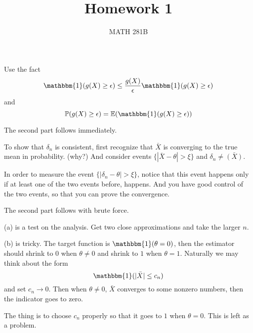 \documentclass[12pt]{article}
\newcommand{\1}{\mathbbm{1}}
\newenvironment{exercise}[2][Exercise]{\begin{trivlist}
\item[\hskip \labelsep {\bfseries #1}\hskip \labelsep {\bfseries #2.}]}{\end{trivlist}}
\newcommand{\E}{\operatorname{\mathbb{E}}}
\renewcommand{\P}{\operatorname{\mathbb{P}}}
\begin{document}
\title{Homework 1}%
\author{MATH 281B} %
\maketitle
\begin{exercise}{8.1}
\end{exercise}

Use the fact
$$
\1 (g(X) \geq \epsilon) \leq \frac{g(X)}{\epsilon} \1 (g(X) \geq \epsilon)
$$
and 
$$
\P (g(X) \geq \epsilon ) = \E (\1 (g(X) \geq \epsilon))
$$

The second part follows immediately.

\begin{exercise}{8.2}
\end{exercise}

To show that $\delta_n$ is consistent, first recognize that $\bar{X}$ is converging to the true mean in probability. (why?) And consider events $\{|\bar{X} - \theta| > \xi \}$ and $\delta_n \neq \bar{(X)}$.

In order to measure the event $\{|\delta_n - \theta| > \xi\}$, notice that this event happens only if at least one of the two events before, happens. And you have good control of the two events, so that you can prove the convergence.

The second part follows with brute force.

\begin{exercise}{8.8}
\end{exercise}

(a) is a test on the analysis. Get two close approximations and take the larger $n$.

(b) is tricky. The target function is $\1 (\theta = 0)$, then the estimator should shrink to $0$ when $\theta \neq 0$ and shrink to $1$ when $\theta =1$. Naturally we may think about the form
$$
\1 (|\bar{X} |\leq c_n)
$$
and set $c_n \rightarrow 0$. Then when $\theta \neq 0$, $\bar{X} $ converges to some nonzero numbers, then the indicator goes to zero.

The thing is to choose $c_n$ properly so that it goes to $1$ when $\theta =0$. This is left as a problem.

\begin{exercise}{8.11}
\end{exercise}
\end{document}
